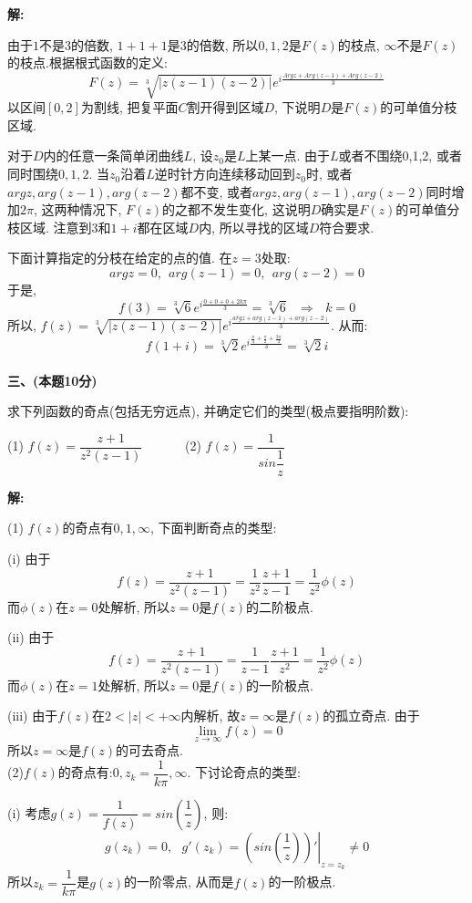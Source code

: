 \documentclass{article}
\begin{document}
\textbf{解:} 

由于$1$不是3的倍数, $1+1+1$是$3$的倍数, 所以$0,1,2$是$F(z)$的枝点, $\infty$不是$F(z)$的枝点.根据根式函数的定义:
$$ F(z) = \sqrt[3]{|z(z-1)(z-2)|}e^{i\frac{Argz + Arg(z-1) + Arg(z-2)}{3}} $$
以区间$[0,2]$为割线, 把复平面$C$割开得到区域$D$, 下说明$D$是$F(z)$的可单值分枝区域. 

对于$D$内的任意一条简单闭曲线$L$,  设$z_0$是$L$上某一点. 由于$L$或者不围绕0,1,2, 或者同时围绕$0,1,2$. 当$z_0$沿着$L$逆时针方向连续移动回到$z_0$时, 或者$argz, arg(z-1), arg(z-2)$都不变, 或者$argz, arg(z-1), arg(z-2)$同时增加$2\pi$, 这两种情况下, $F(z)$的之都不发生变化, 这说明$D$确实是$F(z)$的可单值分枝区域. 注意到$3$和$1+i$都在区域$D$内, 所以寻找的区域$D$符合要求.

下面计算指定的分枝在给定的点的值. 在$z=3$处取:
$$ arg z = 0, \ \ arg(z-1) = 0,\ \  arg(z-2) = 0 $$
于是, 
$$f(3) = \sqrt[3]{6} e^{i\frac{0 + 0 + 0 + 2k\pi}{3}} = \sqrt[3]{6} \ \ \ \Rightarrow \ \ \ k=0$$
所以, $f(z) = \sqrt[3]{|z(z-1)(z-2)|}e^{i\frac{argz + arg(z-1) + arg(z-2)}{3}}$. 从而:
$$ f(1+i) = \sqrt[3]{2}e^{i\frac{\frac{\pi}{4} + \frac{\pi}{2} + \frac{3\pi}{4}}{3}} = \sqrt[3]{2}i $$ \\


\textbf{三、(本题10分)}

求下列函数的奇点(包括无穷远点), 并确定它们的类型(极点要指明阶数):

\hspace{1.3em} (1) $f(z) = \dfrac{z+1}{z^2(z-1)}$ \ \ \ \ \ \ (2) $f(z) = \dfrac{1}{sin\dfrac{1}{z}} $

\textbf{解:}

(1) $f(z)$的奇点有$0,1, \infty$, 下面判断奇点的类型:

(i) 由于
$$ f(z) = \dfrac{z+1}{z^2(z-1)} = \dfrac{1}{z^2}\dfrac{z+1}{z-1} = \dfrac{1}{z^2} \phi(z)  $$
而$\phi(z)$在$z=0$处解析, 所以$z=0$是$f(z)$的二阶极点. 

(ii) 由于
$$ f(z) = \dfrac{z+1}{z^2(z-1)} = \dfrac{1}{z-1}\dfrac{z+1}{z^2} = \dfrac{1}{z^2} \phi(z)  $$
而$\phi(z)$在$z=1$处解析, 所以$z=0$是$f(z)$的一阶极点. 

(iii) 由于$f(z)$在$2 < |z| < +\infty$内解析, 故$z = \infty$是$f(z)$的孤立奇点. 由于
$$ \lim\limits_{z \rightarrow \infty} f(z) = 0 $$
所以$z = \infty$是$f(z)$的可去奇点. \\

(2)$f(z)$的奇点有:$0, z_k = \dfrac{1}{k\pi}, \infty$. 下讨论奇点的类型:

(i) 考虑$ g(z) = \dfrac{1}{f(z)} =  sin(\dfrac{1}{z})$, 则:
$$ g(z_k) = 0, \ \ \ g'(z_k) = \left.\left( sin(\dfrac{1}{z}) \right)'\right|_{z = z_k} \neq 0 $$
所以$z_k = \dfrac{1}{k\pi}$是$g(z)$的一阶零点, 从而是$f(z)$的一阶极点. \\
\end{document}
